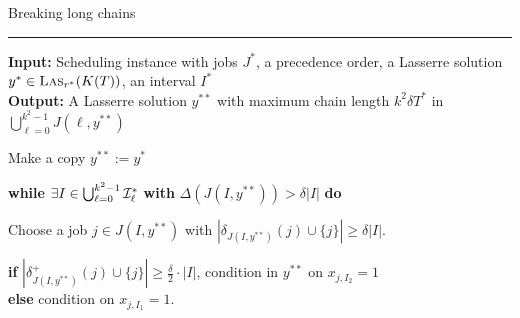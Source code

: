 \begin{multicols}{3}
\begin{center}
{\sc Breaking long chains} \vspace{1mm} \hrule  \vspace{1mm}
\end{center}
{\bf Input:} Scheduling instance with jobs $J^*$, a precedence order, a Lasserre solution $y^* \in \textsc{Las}_{r^*}(K(T))$, an interval $I^*$ \\
{\bf Output:} A Lasserre solution $y^{**}$ with maximum chain length $k^2\delta T^*$ in $\bigcup_{\ell=0}^{k^2-1} J(\ell,y^{**})$
\begin{enumerate*}
\item[(1)] Make a copy $y^{**} := y^*$
   \item[(2)] \textbf{while} $\exists I \in \bigcup_{\ell=0}^{k^2-1} \mathcal{I}_{\ell}^*$ \textbf{with}
$\Delta(J(I,y^{**})) > \delta |I|$ \textbf{do} %
      \begin{enumerate*}
      \item[(3)] Choose a job $j \in J(I,y^{**})$ with $|\delta_{J(I,y^{**})}(j) \cup \{j\}| \geq \delta |I|$. 
      \item[(4)] \textbf{if} $|\delta_{J(I,y^{**})}^+(j) \cup \{ j\}| \geq \frac{\delta}{2} \cdot |I|$, condition in $y^{**}$ on $x_{j,I_2}=1$ \\
\textbf{else} condition on $x_{j,I_1}=1$. 
      \end{enumerate*} 
\end{enumerate*}

\end{multicols}

